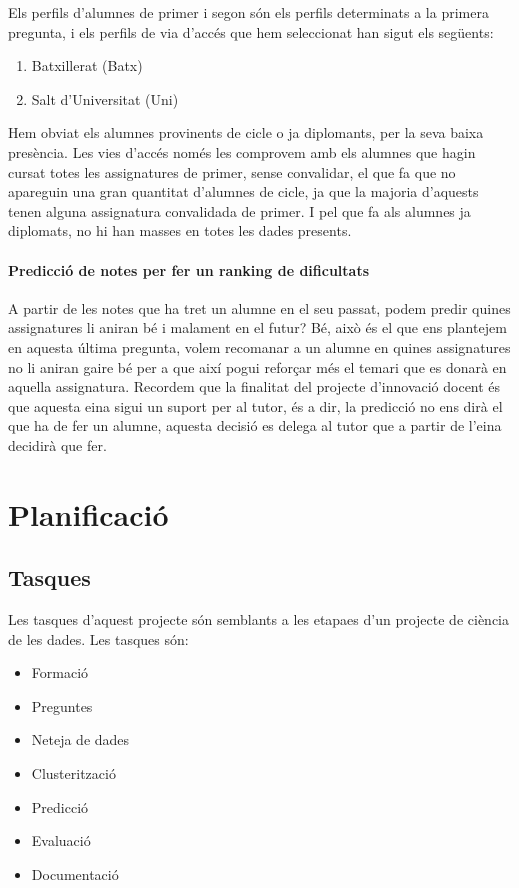 \documentclass[12pt,a4paper,catalan]{article}
\begin{document}
Els perfils d'alumnes de primer i segon són els perfils determinats a la primera pregunta, i els perfils de via d'accés que hem seleccionat han sigut els següents:
\begin{enumerate}
	\item Batxillerat (Batx)
	\item Salt d'Universitat (Uni)
\end{enumerate}

Hem obviat els alumnes provinents de cicle o ja diplomants, per la seva baixa presència. Les vies d'accés només les comprovem amb els alumnes que hagin cursat totes les assignatures de primer, sense convalidar, el que fa que no apareguin una gran quantitat d'alumnes de cicle, ja que la majoria d'aquests tenen alguna assignatura convalidada de primer. I pel que fa als alumnes ja diplomats, no hi han masses en totes les dades presents.

\paragraph{Predicció de notes per fer un ranking de dificultats}
A partir de les notes que ha tret un alumne en el seu passat, podem predir quines assignatures li aniran bé i malament en el futur? Bé, això és el que ens plantejem en aquesta última pregunta, volem recomanar a un alumne en quines assignatures no li aniran gaire bé per a que així pogui reforçar més el temari que es donarà en aquella assignatura. Recordem que la finalitat del projecte d'innovació docent és que aquesta eina sigui un suport per al tutor, és a dir, la predicció no ens dirà el que ha de fer un alumne, aquesta decisió es delega al tutor que a partir de l'eina decidirà que fer.
\newpage

\section{Planificació}
\subsection{Tasques}
Les tasques d'aquest projecte són semblants a les etapaes d'un projecte de ciència de les dades. Les tasques són:
\begin{itemize}[leftmargin=.5in]
	\item Formació
	\item Preguntes
	\item Neteja de dades
	\item Clusterització
	\item Predicció
	\item Evaluació
	\item Documentació
\end{itemize}
\end{document}
